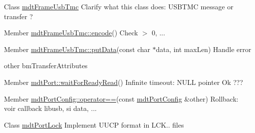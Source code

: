 \label{todo__todo000034}
\hypertarget{todo__todo000034}{}
 
\begin{DoxyDescription}
\item[Class \hyperlink{classmdt_frame_usb_tmc}{mdtFrameUsbTmc} ]Clarify what this class does: USBTMC message or transfer ?
\end{DoxyDescription}

\label{todo__todo000033}
\hypertarget{todo__todo000033}{}
 
\begin{DoxyDescription}
\item[Member \hyperlink{classmdt_frame_usb_tmc_a9406dddfdd70f5dac729b2dbd728de77}{mdtFrameUsbTmc::encode}() ]Check $>$ 0, ... 
\end{DoxyDescription}

\label{todo__todo000031}
\hypertarget{todo__todo000031}{}
 
\begin{DoxyDescription}
\item[Member \hyperlink{classmdt_frame_usb_tmc_a06d2743a113bd2b4cf2ee44014ecd710}{mdtFrameUsbTmc::putData}(const char $\ast$data, int maxLen) ]Handle error 

other bmTransferAttributes 
\end{DoxyDescription}

\label{todo__todo000001}
\hypertarget{todo__todo000001}{}
 
\begin{DoxyDescription}
\item[Member \hyperlink{classmdt_port_a84594fdb56cd455a366c69b0a9228020}{mdtPort::waitForReadyRead}() ]Infinite timeout: NULL pointer Ok ??? 
\end{DoxyDescription}

\label{todo__todo000006}
\hypertarget{todo__todo000006}{}
 
\begin{DoxyDescription}
\item[Member \hyperlink{classmdt_port_config_a639c71f90cfeb7e2160ad90e9775054b}{mdtPortConfig::operator==}(const \hyperlink{classmdt_port_config}{mdtPortConfig} \&other) ]Rollback: voir callback libusb, si data, ... 
\end{DoxyDescription}

\label{todo__todo000002}
\hypertarget{todo__todo000002}{}
 
\begin{DoxyDescription}
\item[Class \hyperlink{classmdt_port_lock}{mdtPortLock} ]Implement UUCP format in LCK.. files 
\end{DoxyDescription}

